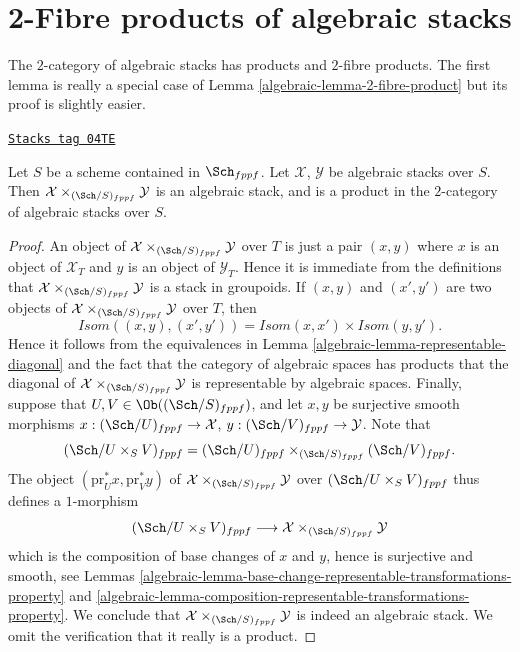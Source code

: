 \section{2-Fibre products of algebraic stacks}
\label{algebraic-section-2-fibre-products}
The $2$-category of algebraic stacks has products and $2$-fibre products.
The first lemma is really a special case of
Lemma \ref{algebraic-lemma-2-fibre-product}
but its proof is slightly easier.

\begin{lemma}
\label{algebraic-lemma-product-spaces}
\href{https://stacks.math.columbia.edu/tag/04TE}{\texttt{Stacks tag 04TE}}

Let $S$ be a scheme contained in $\Sch_{fppf}$.
Let $\mathcal{X}$, $\mathcal{Y}$ be algebraic stacks over $S$.
Then $\mathcal{X} \times_{(\Sch/S)_{fppf}} \mathcal{Y}$
is an algebraic stack, and is a product in the $2$-category of
algebraic stacks over $S$.
\end{lemma}

\begin{proof}

An object of $\mathcal{X} \times_{(\Sch/S)_{fppf}} \mathcal{Y}$
over $T$ is just a pair $(x, y)$ where $x$ is an object of $\mathcal{X}_T$
and $y$ is an object of $\mathcal{Y}_T$. Hence it is immediate from
the definitions that
$\mathcal{X} \times_{(\Sch/S)_{fppf}} \mathcal{Y}$ is a
stack in groupoids. If $(x, y)$ and $(x', y')$ are
two objects of $\mathcal{X} \times_{(\Sch/S)_{fppf}} \mathcal{Y}$
over $T$, then
$$
\mathit{Isom}((x, y), (x', y')) =
\mathit{Isom}(x, x') \times \mathit{Isom}(y, y').
$$
Hence it follows from the equivalences in
Lemma \ref{algebraic-lemma-representable-diagonal}
and the fact that the category of algebraic spaces has products
that the diagonal of $\mathcal{X} \times_{(\Sch/S)_{fppf}} \mathcal{Y}$
is representable by algebraic spaces.
Finally, suppose that $U, V \in \Ob((\Sch/S)_{fppf})$,
and let $x, y$ be surjective smooth morphisms
$x : (\Sch/U)_{fppf} \to \mathcal{X}$,
$y : (\Sch/V)_{fppf} \to \mathcal{Y}$.
Note that
$$
(\Sch/U \times_S V)_{fppf} =
(\Sch/U)_{fppf}
\times_{(\Sch/S)_{fppf}} (\Sch/V)_{fppf}.
$$
The object $(\text{pr}_U^*x, \text{pr}_V^*y)$ of
$\mathcal{X} \times_{(\Sch/S)_{fppf}} \mathcal{Y}$ over
$(\Sch/U \times_S V)_{fppf}$ thus defines a $1$-morphism
$$
(\Sch/U \times_S V)_{fppf}
\longrightarrow
\mathcal{X} \times_{(\Sch/S)_{fppf}} \mathcal{Y}
$$
which is the composition of base changes of $x$ and $y$, hence
is surjective and smooth, see
Lemmas \ref{algebraic-lemma-base-change-representable-transformations-property} and
\ref{algebraic-lemma-composition-representable-transformations-property}.
We conclude that $\mathcal{X} \times_{(\Sch/S)_{fppf}} \mathcal{Y}$
is indeed an algebraic stack. We omit the verification that it
really is a product.
\end{proof}

